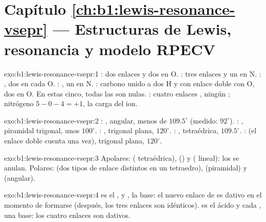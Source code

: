 \section*{Capítulo \ref{ch:b1:lewis-resonance-vsepr} --- Estructuras de Lewis, resonancia y modelo RPECV}

\begin{solution}{exo:b1:lewis-resonance-vsepr:1}
: dos enlaces  y dos  en O. :
tres enlaces  y un  en N. : ,
dos  en cada O. : , un  en N. : carbono unido a dos H y con enlace doble con
O, dos  en O. En estas cinco, todas las  son nulas. : cuatro enlaces , ningún ; nitrógeno $5 - 0 - 4 = +1$, la carga del ion.
\end{solution}

\begin{solution}{exo:b1:lewis-resonance-vsepr:2}
: , angular, menos de $109.5^\circ$ (medido:
$92^\circ$). : , piramidal trigonal, unos $100^\circ$.
: , trigonal plana, $120^\circ$. : ,
tetraédrica, $109.5^\circ$. :  (el enlace doble
cuenta una vez), trigonal plana, $120^\circ$.
\end{solution}

\begin{solution}{exo:b1:lewis-resonance-vsepr:3}
Apolares:  ( tetraédrica),  () y
 ( lineal): los  se anulan. Polares:
 (dos tipos de enlace distintos en un tetraedro), 
(piramidal) y  (angular).
\end{solution}

\begin{solution}{exo:b1:lewis-resonance-vsepr:4}
 es el , y , la base: el nuevo enlace
 de  es dativo en el momento de formarse (después, los
tres enlaces  son idénticos).  es el ácido y cada
, una base: los cuatro enlaces  son dativos.
\end{solution}

